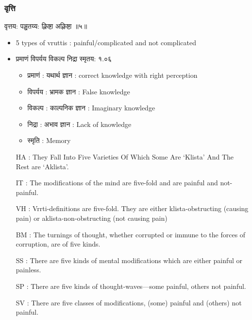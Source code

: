 \begin{frame}[fragile]\frametitle{वृत्ति}

\begin{sanskrit}
वृत्तय: पञ्चतय्य: क्लिष्टा अक्लिष्टा ॥५॥
\end{sanskrit}


	\begin{itemize}
	\item 5 types of vruttis : painful/complicated and not complicated
	\item प्रमाणं विपर्यय विकल्प निद्रा स्मृतय: १.०६
		\begin{itemize}
		\item प्रमाणं : यथार्थ ज्ञान : correct knowledge with right perception
		\item विपर्यय : भ्रामक ज्ञान : False knowledge
		\item विकल्प : काल्पनिक ज्ञान : Imaginary knowledge
		\item निद्रा : अभाव ज्ञान : Lack of knowledge
		\item स्मृति : Memory
		\end{itemize}	
	\item [HA]: They Fall Into Five Varieties Of Which Some Are ‘Klista’ And The Rest are ‘Aklista’.
	\item [IT]: The modifications of the mind are five-fold and are painful and not-painful.
	\item [VH]: Vrrti-definitions are five-fold. They are either klista-obstructing (causing pain) or aklista-non-obstructing (not causing pain)
	\item [BM]: The turnings of thought, whether corrupted or immune to the forces of corruption, are of five kinds.
	\item [SS]: There are five kinds of mental modifications which are either painful or painless.
	\item [SP]: There are five kinds of thought-waves—some painful, others not painful.
	\item [SV]: There are five classes of modifications, (some) painful and (others) not painful.
	\end{itemize}

\end{frame}


